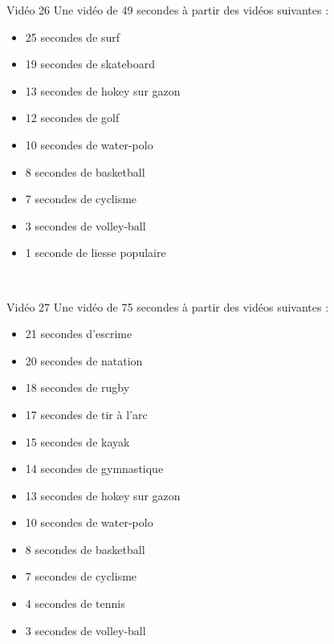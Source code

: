 \documentclass[10pt, a5paper,twoside]{article}
\begin{document}
\begin{card}[width = \textwidth, colback = olympicyellow, colframe = olympicyellow, bottomtitle = 2mm]{Vidéo 26}
  Une vidéo de 49 secondes à partir des vidéos suivantes :
  \vspace{-1mm}\begin{itemize}
    \item 25 secondes de surf
    \item 19 secondes de skateboard
    \item 13 secondes de hokey sur gazon
    \item 12 secondes de golf
    \item 10 secondes de water-polo
    \item 8 secondes de basketball
    \item 7 secondes de cyclisme
    \item 3 secondes de volley-ball
    \item 1 seconde de liesse populaire
  \end{itemize}
\end{card}

\vfill

\clearpage
~
\vfill

\begin{card}[width = \textwidth, colback = olympicyellow, colframe = olympicyellow, bottomtitle = 2mm]{Vidéo 27}
  Une vidéo de 75 secondes à partir des vidéos suivantes :
  \vspace{-1mm}\begin{itemize}
    \item 21 secondes d'escrime
    \item 20 secondes de natation
    \item 18 secondes de rugby
    \item 17 secondes de tir à l'arc
    \item 15 secondes de kayak
    \item 14 secondes de gymnastique
    \item 13 secondes de hokey sur gazon
    \item 10 secondes de water-polo
    \item 8 secondes de basketball
    \item 7 secondes de cyclisme
    \item 4 secondes de tennis
    \item 3 secondes de volley-ball
  \end{itemize}
\end{card}
\end{document}
